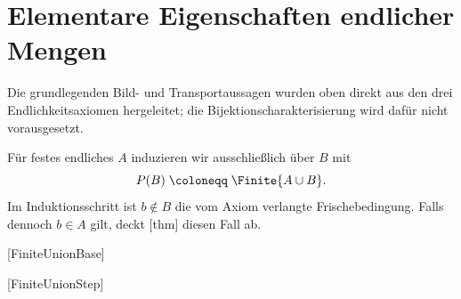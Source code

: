 \documentclass[main.tex]{subfiles}
\begin{document}
\section{Elementare Eigenschaften endlicher Mengen}

Die grundlegenden Bild- und Transportaussagen wurden oben direkt aus den drei
Endlichkeitsaxiomen hergeleitet; die Bijektionscharakterisierung wird dafür
nicht vorausgesetzt.

Für festes endliches \(A\) induzieren wir ausschließlich über \(B\) mit
\[
  P(B)\;\coloneqq\;\Finite{A\cup B}.
\]
Im Induktionsschritt ist \(b\notin B\) die vom Axiom verlangte
Frischebedingung. Falls dennoch \(b\in A\) gilt, deckt
[thm] diesen Fall ab.
\begin{tabproofsplitwide}
  [FiniteUnionBase]
  \closeproofpartwideindR

  [FiniteUnionStep]
  \closeproofpartwideindR

  \closeproofpartwide
\end{tabproofsplitwide}
\end{document}
